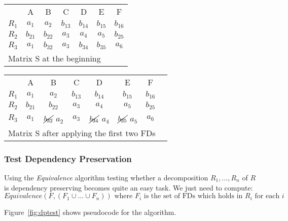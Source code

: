 \footnotesize
\hspace*{-0.5cm}\begin{minipage}[t]{0.5\linewidth}\centering
\begin{tabular}[h]{c|c|c|c|c|c|c|}
  \cline{2-7}
  & A & B & C & D & E & F \\
  \cline{2-7}
  \cline{2-7}
  $R_1$ & $a_{1}$ & $a_2$ & $b_{13}$ & $b_{14}$ & $b_{15}$ & $b_{16}$ \\
  $R_2$ & $b_{21}$ & $b_{22}$ & $a_{3}$ & $a_4$ & $a_5$ & $b_{25}$ \\
  $R_3$ & $a_1$ & $b_{32}$ & $a_{3}$ & $b_{34}$ & $b_{35}$ & $a_6$ \\
  \cline{2-7}
  \multicolumn{7}{l}{Matrix S at the beginning}
\end{tabular}
\end{minipage}
\hspace*{-0.5cm}
\begin{minipage}[t]{0.5\linewidth}\centering
\begin{tabular}[h]{c|c|c|c|c|c|c|c}
  \cline{2-7}
  & A & B & C & D & E & F \\
  \cline{2-7}
  \cline{2-7}
  $R_1$ & $a_{1}$ & $a_2$ & $b_{13}$ & $b_{14}$ & $b_{15}$ & $b_{16}$ \\
  $R_2$ & $b_{21}$ & $b_{22}$ & $a_{3}$ & $a_4$ & $a_5$ & $b_{25}$ \\
  $R_3$ & $a_1$ & $\cancel{b_{32}}$ $a_2$ & $a_{3}$ & $\cancel{b_{34}}$ $a_4$ &$\cancel{b_{35}}$ $a_5$ & $a_6$ \\
  \cline{2-7}
  \multicolumn{8}{l}{Matrix S after applying the first two FDs} \\
\end{tabular}
\end{minipage}
\normalsize

\subsubsection{Test Dependency Preservation} 
Using the \textit{Equivalence} algorithm testing whether a decomposition 
$R_1,...,R_n$ of $R$ is dependency preserving
becomes quite an easy task. We just need to compute: 
\[
  Equivalence(F, (F_1 \cup ... \cup F_n)) \mbox{ where } F_i \mbox{ is the set of FDs which holds in } R_i \mbox{ for each } i 
\] 

Figure~\ref{fig:dptest} shows pseudocode for the algorithm.

